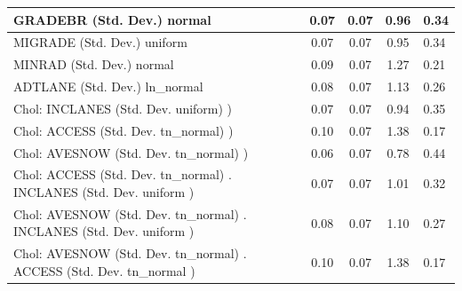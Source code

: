 \begin{table}
\begin{center}
\begin{tabular}{|l|l|c|c|c|l|}
			\hline
			GRADEBR (Std. Dev.) normal &  & 0.07 & 0.07 & 0.96 & 0.34 \\
			\hline
			MIGRADE (Std. Dev.) uniform &  & 0.07 & 0.07 & 0.95 & 0.34 \\
			\hline
			MINRAD (Std. Dev.) normal &  & 0.09 & 0.07 & 1.27 & 0.21 \\
			\hline
			ADTLANE (Std. Dev.) ln_normal &  & 0.08 & 0.07 & 1.13 & 0.26 \\
			\hline
			 Chol: INCLANES (Std. Dev. uniform) ) &  & 0.07 & 0.07 & 0.94 & 0.35 \\
			\hline
			 Chol: ACCESS (Std. Dev. tn_normal) ) &  & 0.10 & 0.07 & 1.38 & 0.17 \\
			\hline
			 Chol: AVESNOW (Std. Dev. tn_normal) ) &  & 0.06 & 0.07 & 0.78 & 0.44 \\
			\hline
			 Chol: ACCESS (Std. Dev. tn_normal) . INCLANES (Std. Dev.   uniform ) &  & 0.07 & 0.07 & 1.01 & 0.32 \\
			\hline
			 Chol: AVESNOW (Std. Dev. tn_normal) . INCLANES (Std. Dev.   uniform ) &  & 0.08 & 0.07 & 1.10 & 0.27 \\
			\hline
			 Chol: AVESNOW (Std. Dev. tn_normal) . ACCESS (Std. Dev.   tn_normal ) &  & 0.10 & 0.07 & 1.38 & 0.17 \\
			\hline
		\end{tabular}
	\end{center}
\end{table}